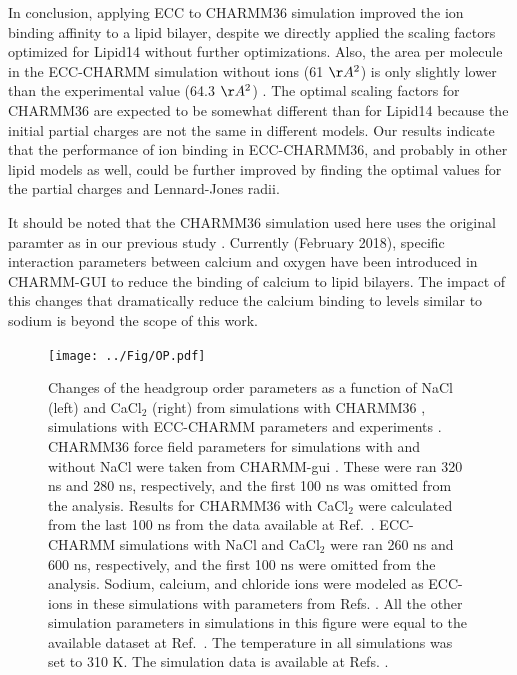 \documentclass[journal=jpcbfk]{achemso}
\begin{document}
In conclusion, applying ECC to CHARMM36 simulation
improved the ion binding affinity to a lipid bilayer, despite we
directly applied the scaling factors optimized for Lipid14 without further optimizations. Also, the area per molecule in
the ECC-CHARMM simulation without ions (61 $\AA^2$) is only slightly
lower than the experimental value (64.3 $\AA^2$) \cite{kucerka11}. 
The optimal scaling factors for CHARMM36 are expected to be somewhat different
than for Lipid14 because the initial partial charges are not the same
in different models. Our results indicate that the performance of ion
binding in ECC-CHARMM36, and probably in other lipid models as well, could
be further improved by finding the optimal values for the partial
charges and Lennard-Jones radii.

It should be noted that the CHARMM36 simulation used here uses the original paramter
as in our previous study \cite{catte16,charmmPOPC450mMCaClfiles}.
Currently (February 2018), specific interaction parameters
between calcium and oxygen \cite{kim16} have been introduced in CHARMM-GUI
to reduce the binding of calcium to lipid bilayers. The impact of this changes that
dramatically reduce the calcium binding to levels similar to sodium is beyond the
scope of this work.



\begin{figure}[!h]
  \centering
  \texttt{[image: ../Fig/OP.pdf]}
  \caption{\label{scaledCHARMM}
    Changes of the headgroup order parameters as a function of NaCl (left) and CaCl$_2$ (right)
    from simulations with CHARMM36 \cite{klauda10}, simulations with ECC-CHARMM parameters and experiments \cite{akutsu81,altenbach84}. 
    CHARMM36 force field parameters for simulations with and without NaCl were taken from CHARMM-gui \cite{lee15}.
    These were ran 320 ns and 280 ns, respectively, and the first 100 ns was omitted from the analysis.
    Results for CHARMM36 with CaCl$_2$ were calculated from the last 100 ns from the data available at Ref.~.
    ECC-CHARMM simulations with NaCl and CaCl$_2$ were ran 260 ns and 600 ns, respectively, and the first 100 ns were omitted from the analysis.
    Sodium, calcium, and chloride ions were modeled as ECC-ions in these simulations with parameters from Refs. .
    All the other simulation parameters in simulations in this figure were equal to the available dataset at Ref.~.
    The temperature in all simulations was set to 310 K.
    The simulation data is available at Refs. .
  }
\end{figure}
\end{document}
